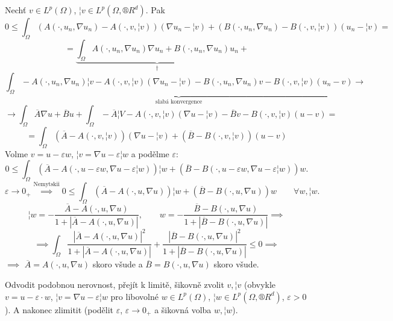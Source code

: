 \documentclass[12pt]{article}					%
\begin{document}
\begin{lemma}
	\begin{dukazin}
		Nechť $v \in L^p(Ω)$, $¦v \in L^p(Ω, ®R^d)$. Pak
				$$ 0 ≤ \int_Ω (A(·, u_n, \nabla u_n) - A(·, v, ¦v))(\nabla u_n - ¦v) + (B(·, u_n, \nabla u_n) - B(·, v, ¦v))(u_n - ¦v) = $$
				$$ = \underbrace{\int_Ω A(·, u_n, \nabla u_n) \nabla u_n + B(·, u_n, \nabla u_n) u_n}_{\dagger} + $$
				$$ \underbrace{\int_Ω -A(·, u_n, \nabla u_n)¦v - A(·, v, ¦v)(\nabla u_n - ¦v) - B(·, u_n, \nabla u_n)v - B(·, v, ¦v)(u_n - v)}_{\text{slabá konvergence}} \rightarrow $$
				$$ \rightarrow \int_Ω \overline{A}\nabla u + \overline{B}u + \int_Ω -\overline{A}¦V - A(·, v, ¦v)(\nabla u - ¦v) - \overline{B}v - B(·, v, ¦v)(u - v) = $$
				$$ = \int_Ω (\overline{A} - A(·, v, ¦v))(\nabla u - ¦v) + (\overline{B} - B(·, v, ¦v))(u - v) $$
				Volme $v = u - ε w$, $¦v = \nabla u - ε ¦w$ a podělme $ε$:
				$$ 0 ≤ \int_Ω (\overline{A} - A(·, u - εw, \nabla u - ε ¦w))¦w + (\overline{B} - B(·, u - εw, \nabla u - ε¦w))w. $$
				$$ ε \rightarrow 0_+ \overset{\text{Nemytskii}}\implies 0 ≤ \int_Ω (\overline{A} - A(·, u, \nabla u))¦w + (\overline{B} - B(·, u, \nabla u))w \qquad \forall w, ¦w. $$
				$$ ¦w = -\frac{\overline{A} - A(·, u, \nabla u)}{1 + |\overline{A} - A(·, u, \nabla u)|}, \qquad w = -\frac{\overline{B} - B(·, u, \nabla u)}{1 + |\overline{B} - B(·, u, \nabla u)|} \implies $$
				$$ \implies \int_Ω \frac{|\overline{A} - A(·, u, \nabla u)|^2}{1 + |\overline{A} - A(·, u, \nabla u)|} + \frac{|\overline{B} - B(·, u, \nabla u)|^2}{1 + |\overline{B} - B(·, u, \nabla u)|} ≤ 0 \implies $$
				$\implies$ $\overline{A} = A(·, u, \nabla u)$ skoro všude a $\overline{B} = B(·, u, \nabla u)$ skoro všude.
	\end{dukazin}

	\begin{poznamka}
		Odvodit podobnou nerovnost, přejít k limitě, šikovně zvolit $v, ¦v$ (obvykle $v = u - ε·w$, $¦v = \nabla u - ε¦w$ pro libovolné $w \in L^p(Ω)$, $¦w \in L^p(Ω, ®R^d)$, $ε > 0$). A nakonec zlimitit (podělit $ε$, $ε \rightarrow 0_+$ a šikovná volba $w, ¦w$).
	\end{poznamka}


\end{lemma}
\end{document}
